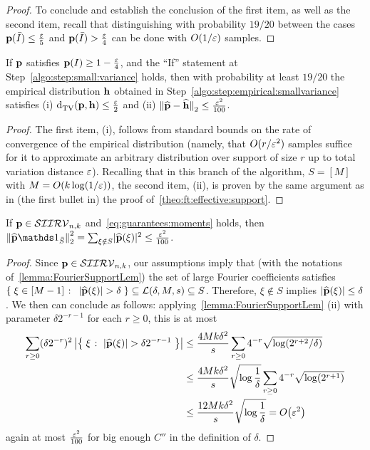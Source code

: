 \begin{proof}
To conclude and establish the conclusion of the first item, as well as the second item, recall that distinguishing with probability $19/20$ between the cases $\p(\bar{I})\leq\frac{\eps}{5}$ and $\p(\bar{I})>\frac{\eps}{4}$ can be done with $O(1/\eps)$ samples.
\end{proof}

\begin{claim}\label{claim:learn:empirical}
  If $\p$ satisfies $\p(I)\geq 1-\frac{\eps}{4}$, and the ``If'' statement at Step~\ref{algo:step:small:variance} holds, then with probability at least $19/20$ the empirical distribution $\h$ obtained in Step~\ref{algo:step:empirical:smallvariance} satisfies (i) $\totalvardist{\p}{\h} \leq \frac{\eps}{2}$ and (ii) $\normtwo{\fourier{\p}-\fourier{\h}} \leq \frac{\eps^2}{100}$.
\end{claim}
\begin{proof}The first item, (i), follows from standard bounds on the rate of convergence of the empirical distribution (namely, that $O(r/\eps^2)$ samples suffice for it to approximate an arbitrary distribution over support of size $r$ up to total variation distance $\eps$). Recalling that in this branch of the algorithm, $S=[M]$ with $M=O(k\log(1/\eps))$, the second item, (ii), is proven by the same argument as in (the first bullet in) the proof of~\cref{theo:ft:effective:support}.
\end{proof}

\begin{claim}\label{claim:ksiirv:fourier:concentrated}
  If $\p \in \classksiirv[n]{k}$ and~\eqref{eq:guarantees:moments} holds, then
  $
      \normtwo{\fourier{\p}\indicSet{\bar{S}}}^2 = \sum_{\xi\notin S} \dabs{\fourier{\p}(\xi)}^2 \leq \frac{\eps^2}{100}
  $.
\end{claim}
\begin{proof}Since $\p \in \classksiirv[n]{k}$, our assumptions imply that (with the notations of~\cref{lemma:FourierSupportLem}) the set of large Fourier coefficients satisfies $\setOfSuchThat{\xi\in[M-1]}{ \abs{\fourier{\p}(\xi)} > \delta } \subseteq \mathcal{L}(\delta, M, s)\subseteq S$. Therefore, $\xi\notin S$ implies $\dabs{\fourier{\p}(\xi)} \leq \delta$. We then can conclude as follows: applying~\cref{lemma:FourierSupportLem} (ii) with parameter $\delta 2^{-r-1}$ for each $r \geq 0$, this is at most
\begin{align}
\sum_{r\geq 0} (\delta 2^{-r})^2  \abs{\setOfSuchThat{ \xi }{ |\fourier{\p}(\xi)| > \delta 2^{-r-1} }} 
&\leq  \frac{4Mk \delta^2}{s} \sum_{r\geq 0} 4^{-r}\sqrt{\log(2^{r+2}/\delta)} \notag\\
& \leq \frac{4Mk \delta^2}{s} \sqrt{\log\frac{1}{\delta}} \sum_{r\geq 0} 4^{-r}\sqrt{\log(2^{r+1})} \notag\\
& \leq \frac{12Mk \delta^2}{s} \sqrt{\log\frac{1}{\delta}} = \bigO{\eps^2} \label{eq:dealing:small:coeffs:p}
\end{align}
again at most $\frac{\eps^2}{100}$ for big enough $C''$ in the definition of $\delta$.
\end{proof}


